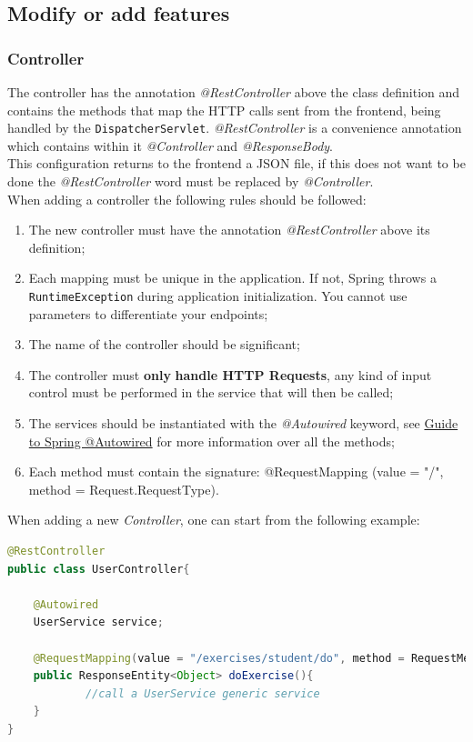 \subsection{Modify or add features}
\subsubsection{Controller}
The controller has the annotation \textit{@RestController} above the class definition and contains the methods that map the HTTP calls sent from the frontend, being handled by the \texttt{DispatcherServlet}. \textit{@RestController} is a convenience annotation which contains within it \textit{@Controller} and \textit{@ResponseBody}.\\
This configuration returns to the frontend a JSON file, if this does not want to be done the \textit{@RestController} word must be replaced by \textit{@Controller}.\\
When adding a controller the following rules should be followed:
\begin{enumerate}
\item The new controller must have the annotation \textit{@RestController} above its definition;
\item Each mapping must be unique in the application. If not, Spring throws a \texttt{RuntimeException} during application initialization. You cannot use parameters to differentiate your endpoints;
\item The name of the controller should be significant;
\item The controller must \textbf{only} \textbf{handle HTTP Requests}, any kind of input control must be performed in the service that will then be called;
\item The services should be instantiated with the \textit{@Autowired} keyword, see \href{https://www.baeldung.com/spring-autowire}{Guide to Spring @Autowired} for more information over all the methods;
\item Each method must contain the signature: @RequestMapping (value = "/", method = Request.RequestType).
\end{enumerate}
When adding a new \textit{Controller}, one can start from the following example:
\begin{lstlisting}[language=Java]
@RestController
public class UserController{

	@Autowired
	UserService service; 
	
	@RequestMapping(value = "/exercises/student/do", method = RequestMethod.POST, produces = MediaType.APPLICATION_JSON_VALUE)
	public ResponseEntity<Object> doExercise(){
			//call a UserService generic service
	}
}
\end{lstlisting}
